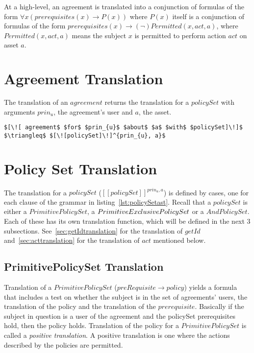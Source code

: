 At a high-level, an agreement is translated into a conjunction of formulas of the form $\forall x ( prerequisites(x) \rightarrow P(x))$ where $P(x)$ itself is a conjunction of formulas of the form $ prerequisites(x) \rightarrow (\lnot) Permitted (x, act, a)$, where $Permitted (x, act, a)$ means the subject $x$ is permitted to perform action $act$ on asset $a$.

\section{Agreement Translation}
The translation of an $agreement$ returns the translation for a $policySet$ with arguments $prin_{u}$, the agreement's user and $a$, the asset.


\lstset{mathescape, language=AST}  
\begin{lstlisting}[frame=single, caption={Agreement Translation},label={lst:transAgreementast}]
$[\![ agreement$ $for$ $prin_{u}$ $about$ $a$ $with$ $policySet]\!]$ $\triangleq$ $[\![policySet]\!]^{prin_{u}, a}$
\end{lstlisting}

\section{Policy Set Translation}
The translation for a $policySet$ ($[\![policySet]\!]^{prin_{u}, a}$) is defined by cases, one for each clause of the grammar in listing~\ref{lst:policySetast}. Recall that a $policySet$ is either a $PrimitivePolicySet$, a $\linebreak PrimitiveExclusivePolicySet$ or a $AndPolicySet$. Each of these has its own translation function, which will be defined in the next 3 subsections. See~\ref{sec:getIdtranslation} for the translation of $getId$ and~\ref{sec:acttranslation} for the translation of $act$ mentioned below.


\subsection{PrimitivePolicySet Translation}
Translation of a $PrimitivePolicySet$ ($preRequisite \rightarrow policy$) yields a formula that includes a test on whether the subject is in the set of agreements' users, the translation of the policy and the translation of the $prerequisite$. Basically if the subject in question is a user of the agreement and the policySet prerequisites hold, then the policy holds. Translation of the policy for a $PrimitivePolicySet$ is called a \emph{positive translation}. A positive translation is one where the actions described by the policies are permitted.   

